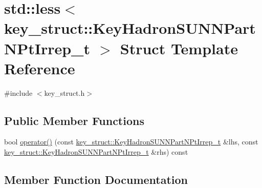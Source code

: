 \hypertarget{structstd_1_1less_3_01key__struct_1_1KeyHadronSUNNPartNPtIrrep__t_01_4}{}\section{std\+:\+:less$<$ key\+\_\+struct\+:\+:Key\+Hadron\+S\+U\+N\+N\+Part\+N\+Pt\+Irrep\+\_\+t $>$ Struct Template Reference}
\label{structstd_1_1less_3_01key__struct_1_1KeyHadronSUNNPartNPtIrrep__t_01_4}


{\ttfamily \#include $<$key\+\_\+struct.\+h$>$}

\subsection*{Public Member Functions}
\begin{DoxyCompactItemize}
\item 
bool \mbox{\hyperlink{structstd_1_1less_3_01key__struct_1_1KeyHadronSUNNPartNPtIrrep__t_01_4_a3777310df409b732027553da6b929380}{operator()}} (const \mbox{\hyperlink{structkey__struct_1_1KeyHadronSUNNPartNPtIrrep__t}{key\+\_\+struct\+::\+Key\+Hadron\+S\+U\+N\+N\+Part\+N\+Pt\+Irrep\+\_\+t}} \&lhs, const \mbox{\hyperlink{structkey__struct_1_1KeyHadronSUNNPartNPtIrrep__t}{key\+\_\+struct\+::\+Key\+Hadron\+S\+U\+N\+N\+Part\+N\+Pt\+Irrep\+\_\+t}} \&rhs) const
\end{DoxyCompactItemize}


\subsection{Member Function Documentation}
\mbox{\label{structstd_1_1less_3_01key__struct_1_1KeyHadronSUNNPartNPtIrrep__t_01_4_a3777310df409b732027553da6b929380}} 
